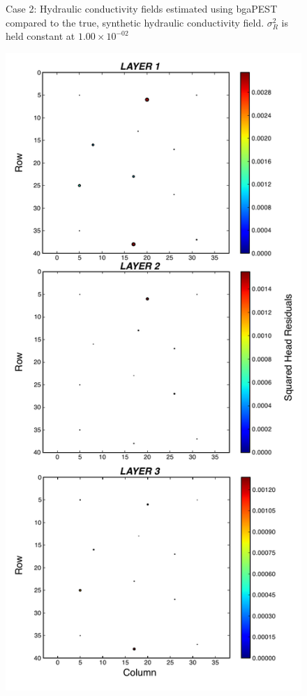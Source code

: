 \documentclass[11pt,oneside,onecolumn]{usgsreport}
\begin{document}
\begin{appendix}
\begin{figure}[!t]
\caption{\label{fig:3LK_case2}Case 2: Hydraulic conductivity fields estimated
using bgaPEST compared to the true, synthetic hydraulic conductivity
field.  $\sigma_{R}^{2}$ is held constant at $1.00\times10^{-02}$}
\end{figure}


\begin{figure}[!t]
\begin{center}\includegraphics[scale=0.5]{figures/3L_resid_case2}\end{center}


\end{figure}
\end{appendix}
\end{document}
